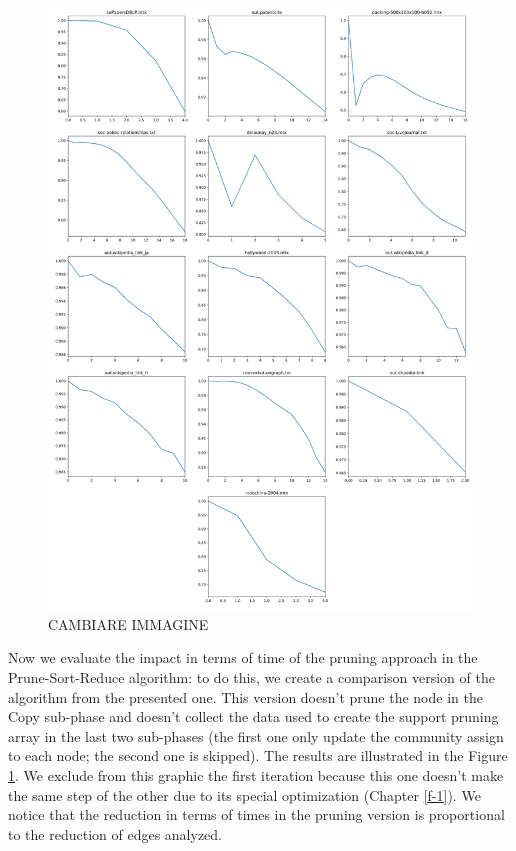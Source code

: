 \begin{figure}[h]
	\centering
	\includegraphics[width=0.7\linewidth]{0-resources/edge-percentage}
	\caption{CAMBIARE IMMAGINE}
	\label{fig:prun-vs-no}
\end{figure}
Now we evaluate the impact in terms of time of the pruning approach in the Prune-Sort-Reduce algorithm: to do this, we create a comparison version of the algorithm from the presented one. This version doesn't prune the node in the Copy sub-phase and doesn't collect the data used to create the support pruning array in the last two sub-phases (the first one only update the community assign to each node; the second one is skipped). The results are illustrated in the Figure \ref{fig:prun-vs-no}. We exclude from this graphic the first iteration because this one doesn't make the same step of the other due to its special optimization (Chapter \ref{f-1}). We notice that the reduction in terms of times in the pruning version is proportional to the reduction of edges analyzed. 
